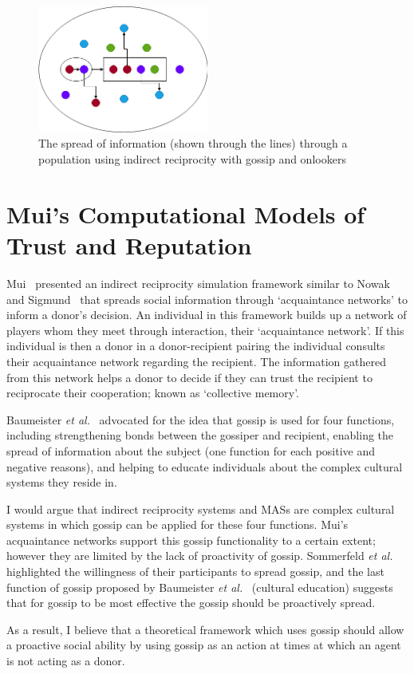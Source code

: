 \documentclass[]{final_report}
\begin{document}
\begin{figure}
	\center
	\includegraphics[width=0.5\textwidth]{Gossip_and_onlookers.png}
	\caption{The spread of information (shown through the lines) through a population using indirect reciprocity with gossip and onlookers}
	\label{fig:gossip_and_onlookers}
\end{figure}

\section{Mui's Computational Models of Trust and Reputation}
Mui~\cite{mui2002computational} presented an indirect reciprocity simulation framework similar to Nowak and Sigmund~\cite{evol_indirect_image} that spreads social information through `acquaintance networks' to inform a donor's decision. An individual in this framework builds up a network of players whom they meet through interaction, their `acquaintance network'. If this individual is then a donor in a donor-recipient pairing the individual consults their acquaintance network regarding the recipient. The information gathered from this network helps a donor to decide if they can trust the recipient to reciprocate their cooperation; known as `collective memory'.\par
Baumeister \textit{et al.}~\cite{baumeister2004gossip} advocated for the idea that gossip is used for four functions, including strengthening bonds between the gossiper and recipient, enabling the spread of information about the subject (one function for each positive and negative reasons), and helping to educate individuals about the complex cultural systems they reside in.\par
I would argue that indirect reciprocity systems and MASs are complex cultural systems in which gossip can be applied for these four functions. Mui's acquaintance networks support this gossip functionality to a certain extent; however they are limited by the lack of proactivity of gossip. Sommerfeld \textit{et al.}~\cite{gossip_alt} highlighted the willingness of their participants to spread gossip, and the last function of gossip proposed by Baumeister \textit{et al.}~\cite{baumeister2004gossip} (cultural education) suggests that for gossip to be most effective the gossip should be proactively spread.\par
As a result, I believe that a theoretical framework which uses gossip should allow a proactive social ability  by using gossip as an action at times at which an agent is not acting as a donor. 
\end{document}

